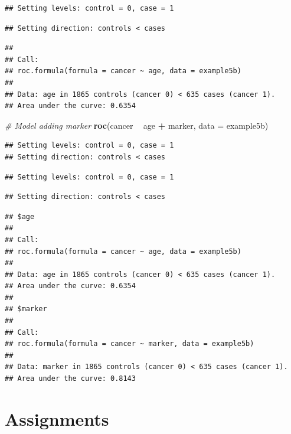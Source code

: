 \documentclass[]{book}
\newenvironment{Shaded}{\begin{snugshade}}{\end{snugshade}}
\newcommand{\CommentTok}[1]{\textcolor[rgb]{0.56,0.35,0.01}{\textit{#1}}}
\newcommand{\DataTypeTok}[1]{\textcolor[rgb]{0.13,0.29,0.53}{#1}}
\newcommand{\KeywordTok}[1]{\textcolor[rgb]{0.13,0.29,0.53}{\textbf{#1}}}
\newcommand{\NormalTok}[1]{#1}
\newcommand{\OperatorTok}[1]{\textcolor[rgb]{0.81,0.36,0.00}{\textbf{#1}}}
\newcommand{\StringTok}[1]{\textcolor[rgb]{0.31,0.60,0.02}{#1}}
\begin{document}
\begin{verbatim}
## Setting levels: control = 0, case = 1
\end{verbatim}

\begin{verbatim}
## Setting direction: controls < cases
\end{verbatim}

\begin{verbatim}
## 
## Call:
## roc.formula(formula = cancer ~ age, data = example5b)
## 
## Data: age in 1865 controls (cancer 0) < 635 cases (cancer 1).
## Area under the curve: 0.6354
\end{verbatim}

\begin{Shaded}
\begin{Highlighting}[]
\CommentTok{# Model adding marker}
\KeywordTok{roc}\NormalTok{(cancer }\OperatorTok{~}\StringTok{ }\NormalTok{age }\OperatorTok{+}\StringTok{ }\NormalTok{marker, }\DataTypeTok{data =}\NormalTok{ example5b)}
\end{Highlighting}
\end{Shaded}

\begin{verbatim}
## Setting levels: control = 0, case = 1
## Setting direction: controls < cases
\end{verbatim}

\begin{verbatim}
## Setting levels: control = 0, case = 1
\end{verbatim}

\begin{verbatim}
## Setting direction: controls < cases
\end{verbatim}

\begin{verbatim}
## $age
## 
## Call:
## roc.formula(formula = cancer ~ age, data = example5b)
## 
## Data: age in 1865 controls (cancer 0) < 635 cases (cancer 1).
## Area under the curve: 0.6354
## 
## $marker
## 
## Call:
## roc.formula(formula = cancer ~ marker, data = example5b)
## 
## Data: marker in 1865 controls (cancer 0) < 635 cases (cancer 1).
## Area under the curve: 0.8143
\end{verbatim}

\hypertarget{assignments-4}{%
\section{Assignments}\label{assignments-4}}
\end{document}
